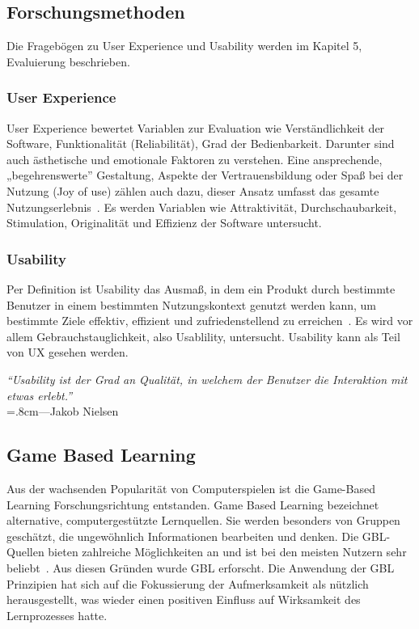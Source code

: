 \subsection{Forschungsmethoden}
Die Fragebögen zu User Experience und Usability werden im Kapitel 5, Evaluierung beschrieben.
\subsubsection{User Experience}
User Experience bewertet Variablen zur Evaluation wie Verständlichkeit der Software, Funktionalität (Reliabilität), Grad der Bedienbarkeit.
Darunter sind auch ästhetische und emotionale Faktoren zu verstehen. Eine ansprechende, „begehrenswerte” Gestaltung, Aspekte der Vertrauensbildung oder Spaß bei der Nutzung (Joy of use) zählen auch dazu, dieser Ansatz umfasst das gesamte Nutzungserlebnis~\cite{UX}. Es werden Variablen wie Attraktivität, Durchschaubarkeit, Stimulation, Originalität und Effizienz der Software untersucht.

\subsubsection{Usability}
Per Definition ist Usability das Ausmaß, in dem ein Produkt durch bestimmte Benutzer in einem bestimmten Nutzungskontext genutzt werden kann, um bestimmte Ziele effektiv, effizient und zufriedenstellend zu erreichen~\cite{ISO9241}. Es wird vor allem Gebrauchstauglichkeit, also Usablility, untersucht. Usability kann als Teil von UX gesehen werden.
\begin{flushright}
\rightskip=1.8cm\textit{``Usability ist der Grad an Qualität, in welchem der Benutzer die Interaktion mit etwas erlebt.''} \\
\vspace{.2em}
\rightskip=.8cm---Jakob Nielsen
\end{flushright}
\vspace{1em}
\noindent

\subsection{Game Based Learning}
Aus der wachsenden Popularität von Computerspielen ist die Game-Based Learning Forschungsrichtung entstanden. Game Based Learning bezeichnet alternative, computergestützte Lernquellen. Sie werden besonders von Gruppen geschätzt, die ungewöhnlich Informationen bearbeiten und denken. Die GBL-Quellen bieten zahlreiche Möglichkeiten an und ist bei den meisten Nutzern sehr beliebt~\cite{Prensky2003DigitalGL}.
Aus diesen Gründen wurde GBL erforscht. Die Anwendung der GBL Prinzipien hat sich auf die Fokussierung der Aufmerksamkeit als nützlich herausgestellt, was wieder einen positiven Einfluss auf Wirksamkeit des Lernprozesses hatte. 
